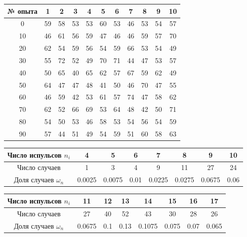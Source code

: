 \documentclass[12pt, a4paper]{article}
\begin{document}
            \begin{center}
                \begin{tabular}{ |c|c|c|c|c|c|c|c|c|c|c| } \hline
                    № опыта & 1 & 2 & 3 & 4 & 5 & 6 & 7 & 8 & 9 & 10 \\ \hline
                    0 & 59 & 58 & 53 & 53 & 60 & 53 & 46 & 53 & 54 & 57 \\ \hline
                    10 & 46 & 61 & 56 & 59 & 47 & 46 & 46 & 59 & 57 & 70 \\ \hline
                    20 & 62 & 54 & 59 & 56 & 54 & 59 & 66 & 53 & 54 & 49 \\ \hline
                    30 & 55 & 72 & 52 & 49 & 70 & 71 & 44 & 47 & 53 & 57 \\ \hline
                    40 & 50 & 65 & 40 & 65 & 62 & 57 & 67 & 59 & 62 & 49 \\ \hline
                    50 & 64 & 47 & 47 & 48 & 41 & 50 & 46 & 70 & 47 & 55 \\ \hline
                    60 & 46 & 59 & 42 & 53 & 61 & 57 & 74 & 47 & 58 & 62 \\ \hline
                    70 & 62 & 52 & 66 & 69 & 53 & 64 & 48 & 42 & 50 & 71 \\ \hline
                    80 & 54 & 50 & 53 & 46 & 58 & 53 & 54 & 56 & 54 & 59 \\ \hline
                    90 & 57 & 44 & 51 & 49 & 54 & 59 & 51 & 60 & 58 & 63 \\ \hline
                \end{tabular}
                \end{center} 

                \begin{center}
                    \begin{tabular}{ |c|c|c|c|c|c|c|c| } \hline
                    Число испульсов $n_i$ & 4 & 5 & 6 & 7 & 8 & 9 & 10 \\ \hline 
                    Число случаев & 1 & 3 & 4 & 9 & 11 & 27 & 24 \\ \hline 
                    Доля случаев $\omega_n$ & 0.0025 & 0.0075 & 0.01 & 0.0225 & 0.0275 & 0.0675 & 0.06 \\ \hline
                    \end{tabular}
                    \end{center} 
    
                    \begin{center}
                        \begin{tabular}{ |c|c|c|c|c|c|c|c| } \hline
                        Число испульсов $n_i$ & 11 & 12 & 13 & 14 & 15 & 16 & 17 \\ \hline 
                        Число случаев & 27 & 40 & 52 & 43 & 30 & 28 & 26 \\ \hline 
                        Доля случаев $\omega_n$ & 0.0675 & 0.1 & 0.13 & 0.1075 & 0.075 & 0.07 & 0.065 \\ \hline
                        \end{tabular}
                        \end{center} 
            
\end{document}
